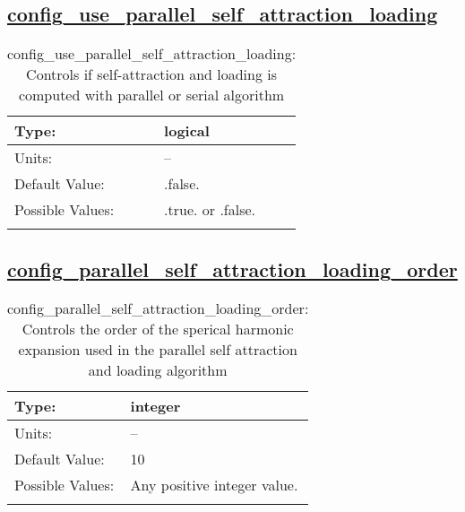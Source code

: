 \subsection[config\_use\_parallel\_self\_attraction\_loading]{\hyperref[sec:nm_tab_self_attraction_loading]{config\_use\_parallel\_self\_attraction\_loading}}
\label{subsec:nm_sec_config_use_parallel_self_attraction_loading}
\begin{center}
\begin{longtable}{| p{2.0in} || p{4.0in} |}
    \hline
    Type: & logical \\
    \hline
    Units: & -- \\
    \hline
    Default Value: & .false. \\
    \hline
    Possible Values: & .true. or .false. \\
    \hline
    \caption{config\_use\_parallel\_self\_attraction\_loading: Controls if self-attraction and loading is computed with parallel or serial algorithm}
\end{longtable}
\end{center}
\subsection[config\_parallel\_self\_attraction\_loading\_order]{\hyperref[sec:nm_tab_self_attraction_loading]{config\_parallel\_self\_attraction\_loading\_order}}
\label{subsec:nm_sec_config_parallel_self_attraction_loading_order}
\begin{center}
\begin{longtable}{| p{2.0in} || p{4.0in} |}
    \hline
    Type: & integer \\
    \hline
    Units: & -- \\
    \hline
    Default Value: & 10 \\
    \hline
    Possible Values: & Any positive integer value. \\
    \hline
    \caption{config\_parallel\_self\_attraction\_loading\_order: Controls the order of the sperical harmonic expansion used in the parallel self attraction and loading algorithm}
\end{longtable}
\end{center}
